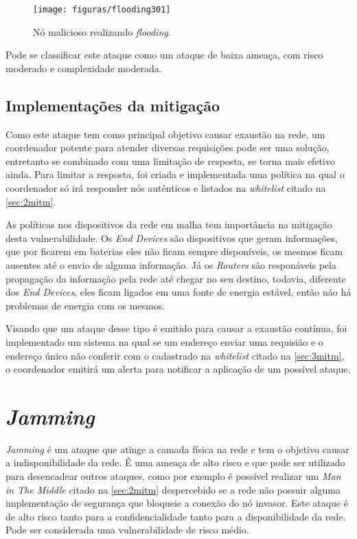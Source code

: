 \begin{figure}[ht]
	\centering
	\caption{N\'o malicioso realizando \emph{flooding}.}
	\texttt{[image: figuras/flooding301]}
    \label{fig:flooding301}
\end{figure}

\par Pode se classificar este ataque como um ataque de baixa amea\c{c}a, com risco moderado e complexidade moderada.

\subsection{Implementações da mitigação}
\par Como este ataque tem como principal objetivo causar exaustão na rede, um coordenador potente para atender diversas requisi\c{c}\~oes pode ser uma solu\c{c}\~ao, entretanto se combinado com uma limita\c{c}\~ao de resposta, se torna mais efetivo ainda. Para limitar a resposta, foi criada e implementada uma pol\'itica na qual o coordenador s\'o ir\'a responder n\'os aut\^enticos e listados na \emph{whitelist} citado na \autoref{sec:2mitm}.

\par As pol\'iticas nos dispositivos da rede em malha tem import\^ancia na mitiga\c{c}\~ao desta vulnerabilidade. Os \emph{End Devices} s\~ao dispositivos que geram informa\c{c}\~oes, que por ficarem em baterias eles n\~ao ficam sempre dispon\'iveis, os mesmos ficam ausentes at\'e o envio de alguma informa\c{c}\~ao. J\'a os \emph{Routers} s\~ao respon\'aveis pela propaga\c{c}\~ao da informa\c{c}\~ao pela rede at\'e chegar no seu destino, todavia, diferente dos \emph{End Devices}, eles ficam ligados em uma fonte de energia est\'avel, então n\~ao h\'a problemas de energia com os mesmos.

\par Visando que um ataque desse tipo \'e emitido para causar a exaust\~ao cont\'inua, foi implementado um sistema na qual se um endere\c{c}o enviar uma requisi\~ao e o endere\c{c}o \'unico n\~ao conferir com o cadastrado na \emph{whitelist} citado na \autoref{sec:3mitm}, o coordenador emitir\'a um alerta para notificar a aplica\c{c}\~ao de um poss\'ivel ataque.

\section{\emph{Jamming}}
\label{sec:jammer}
\par \emph{Jamming} \'e um ataque que atinge a camada f\'isica na rede e tem o objetivo causar a indisponibilidade da rede. \'E uma amea\c{c}a de alto risco e que pode ser utilizado para desencadear outros ataques, como por exemplo \'e poss\'ivel realizar um \emph{Man in The Middle} citado na \autoref{sec:2mitm} despercebido se a rede n\~ao possuir alguma implementa\c{c}\~ao de seguran\c{c}a que bloqueie a conex\~ao do n\'o invasor. Este ataque \'e de alto risco tanto para a confidencialidade tanto para a disponibilidade da rede. Pode ser considerada uma vulnerabilidade de risco m\'edio.

